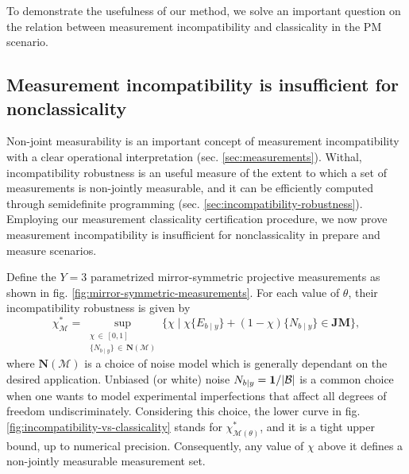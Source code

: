        To demonstrate the usefulness of our method, we solve an important question on the relation between measurement incompatibility and classicality in the PM scenario.

        \subsection{Measurement incompatibility is insufficient for nonclassicality}
        \label{sec:incompatibility-vs-classicality}

            Non-joint measurability is an important concept of measurement incompatibility with a clear operational interpretation (sec. \ref{sec:measurements}). Withal, incompatibility robustness is an useful measure of the extent to which a set of measurements is non-jointly measurable, and it can be efficiently computed through semidefinite programming (sec. \ref{sec:incompatibility-robustness}). Employing our measurement classicality certification procedure, we now prove measurement incompatibility is insufficient for nonclassicality in prepare and measure scenarios.

            Define the $Y=3$ parametrized mirror-symmetric projective measurements as shown in fig. \ref{fig:mirror-symmetric-measurements}. For each value of $\theta$, their incompatibility robustness is given by
            \begin{equation}
                    \chi^*_\mathcal{M} = \sup_{\substack{\chi \,\in\, [0, 1]\\ \{ N_{b \mid y}\} \,\in\, \textbf{N}( \mathcal{M} )}} \Big\{ \chi \mid \chi \{ E_{b \mid y} \} + (1 - \chi) \{ N_{b \mid y} \} \in \textbf{JM} \Big\} ,
            \end{equation}
            where $\mathbf{N}(\mathcal{M})$ is a choice of noise model which is generally dependant on the desired application. Unbiased (or white) noise $N_{b|y} = \mathbf{1}/\abs{\mathcal{B}}$ is a common choice when one wants to model experimental imperfections that affect all degrees of freedom undiscriminately. Considering this choice, the lower curve in fig. \ref{fig:incompatibility-vs-classicality} stands for $\chi^*_{\mathcal{M}(\theta)}$, and it is a tight upper bound, up to numerical precision. Consequently, any value of $\chi$ above it defines a non-jointly measurable measurement set.

